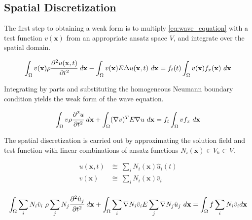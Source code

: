 \subsection{Spatial Discretization}
\label{subsection:wave_equation_spatial_discretization}

The first step to obtaining a weak form is to multiply \ref{eq:wave_equation} with a test function $v(\mathbf x)$ from an appropriate ansatz space $V$, and integrate over the spatial domain.

\begin{equation}
	\int_{\Omega} v(\mathbf x) \rho \cfrac{\partial^2 u(\mathbf x, t)}{\partial t^2} \ d \mathbf x
	-
	\int_{\Omega} v(\mathbf x) E \Delta u(\mathbf x, t) \ d \mathbf x
	=
	f_t(t) \int_{\Omega} v(\mathbf x) f_x(\mathbf x) \ d \mathbf x
\end{equation}

Integrating by parts and substituting the homogeneous Neumann boundary condition yields the weak form of the wave equation.

\begin{equation} \label{eq:wave_equation_weak_form}
	\int_{\Omega} v \rho \cfrac{\partial^2 u}{\partial t^2} \ d \mathbf x
	+
	\int_{\Omega} (\nabla v)^T E \nabla u \ d \mathbf x
	=
	f_t \int_{\Omega} v f_x \ d \mathbf x
\end{equation}

The spatial discretization is carried out by approximating the solution field and test function with linear combinations of ansatz functions $N_i(\mathbf x) \in V_h \subset V$.

\begin{equation}
	\begin{array}{rl}
		u(\mathbf x, t) &\cong \ \sum_i N_i(\mathbf x) \hat u_i(t) \\
		v(\mathbf x) &\cong \ \sum_i N_i(\mathbf x) \hat v_i \\
	\end{array}
\end{equation}

\begin{equation} \label{eq:wave_equation_spatially_discretized_test}
	\int_{\Omega} \sum_i N_i \hat v_i \ \rho \sum_j N_j \cfrac{\partial^2 \hat u_j}{\partial t^2} \ d \mathbf x
	+
	\int_{\Omega} \sum_i \nabla N_i \hat v_i E \sum_j \nabla N_j \hat u_j \ d \mathbf x
	=
	\int_{\Omega} f \sum_i N_i \hat v_i d \mathbf x
\end{equation}

